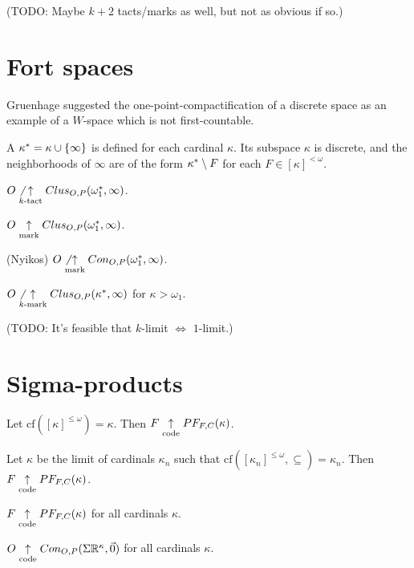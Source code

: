 (TODO: Maybe $k+2$ tacts/marks as well, but not as obvious if so.)



\section{Fort spaces}

Gruenhage suggested the one-point-compactification of a discrete space as
an example of a $W$-space which is not first-countable.

\begin{defn}
  A  $\kappa^*=\kappa\cup\{\infty\}$ is defined
  for each cardinal $\kappa$. Its subspace $\kappa$ is discrete, and the
  neighborhoods of $\infty$ are of the form $\kappa^*\setminus F$
  for each $F\in[\kappa]^{<\omega}$.
\end{defn}

\begin{thm}
$O\not\underset{k\text{-tact}}{\uparrow}Clus_{O,P}(\omega_1^*,\infty)$.
\end{thm}

\begin{thm}
$O\underset{\text{mark}}{\uparrow} Clus_{O,P}(\omega_1^*,\infty)$.
\end{thm}

\begin{thm}(Nyikos)
$O\not\underset{\text{mark}}{\uparrow} Con_{O,P}(\omega_1^*,\infty)$.
\end{thm}

\begin{thm}
$O\not\underset{k\text{-mark}}{\uparrow}Clus_{O,P}(\kappa^*,\infty)$ for $\kappa>\omega_1$.
\end{thm}

(TODO: It's feasible that $k$-limit $\Leftrightarrow$ $1$-limit.)

\section{Sigma-products}

\begin{thm}
  Let $\textrm{cf}([\kappa]^{\leq\omega})=\kappa$.
  Then $F \underset{\text{code}}{\uparrow} PF_{F,C}(\kappa)$.
\end{thm}

\begin{thm}
  Let $\kappa$ be the limit of cardinals $\kappa_n$ such that
  $\textrm{cf}([\kappa_n]^{\leq\omega},\subseteq)=\kappa_n$.
  Then $F \underset{\text{code}}{\uparrow} PF_{F,C}(\kappa)$.
\end{thm}

\begin{thm}
  $F\underset{\text{code}}{\uparrow}PF_{F,C}(\kappa)$ for all cardinals $\kappa$.
\end{thm}

\begin{cor}
  $O\underset{\text{code}}{\uparrow}Con_{O,P}(\Sigma\mathbb{R}^{\kappa},\vec{0})$
  for all cardinals $\kappa$.
\end{cor}
